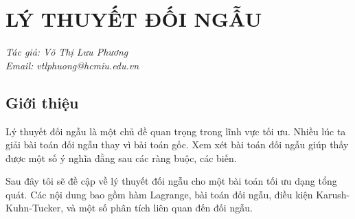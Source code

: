 \documentclass{book}
\begin{document}
%
%

\setcounter{chapter}{4}
\chapter{LÝ THUYẾT ĐỐI NGẪU}
\textit{Tác giả: Võ Thị Lưu Phương\\Email: vtlphuong@hcmiu.edu.vn}


\section{Giới thiệu}
Lý thuyết đối ngẫu là một chủ đề quan trọng trong lĩnh vực tối ưu. Nhiều lúc ta giải bài toán đối ngẫu thay vì bài toán gốc. Xem xét bài toán đối ngẫu giúp thấy được một số ý nghĩa đằng sau các ràng buộc, các biến.


Sau đây tôi sẽ đề cập về lý thuyết đối ngẫu cho một bài toán tối ưu dạng tổng quát. Các nội dung bao gồm hàm Lagrange, bài toán đối ngẫu, điều kiện Karush-Kuhn-Tucker, và một số phân tích liên quan đến đối ngẫu.
\end{document}
